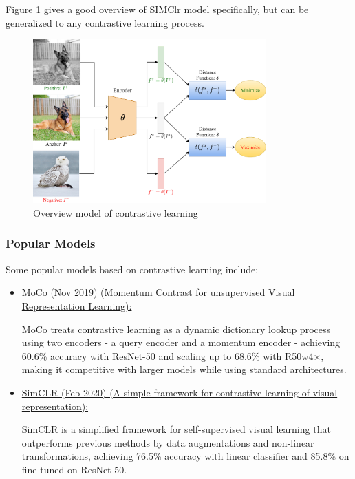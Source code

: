 \documentclass[letterpaper,12pt]{article}
\begin{document}
\begin{spacing}{1.125}
\begin{itemize}
\end{itemize}

Figure \ref{clr} gives a good overview of SIMClr model specifically, but can be
generalized to any contrastive learning process.

\begin{figure}
\includegraphics[width=0.8\textwidth]{clr.png}
  \caption{Overview model of contrastive learning}
  \label{clr}
\end{figure}

\subsubsection{Popular Models}

Some popular models based on contrastive learning include:

\begin{itemize}
  \item \href{https://arxiv.org/abs/1911.05722}{MoCo (Nov 2019) (Momentum
    Contrast for unsupervised Visual Representation Learning):}

MoCo treats contrastive learning as a dynamic dictionary lookup process using two encoders - a
query encoder and a momentum encoder - achieving 60.6\% accuracy with ResNet-50 and scaling
up to 68.6\% with R50w4×, making it competitive with larger models while using standard
architectures.
\item \href{https://arxiv.org/abs/2002.05709}{SimCLR (Feb 2020) (A simple framework for contrastive learning of
  visual representation):}

SimCLR is a simplified framework for self-supervised visual learning that outperforms previous
methods by data augmentations and non-linear transformations, achieving 76.5\% accuracy with
linear classifier and 85.8\% on fine-tuned on ResNet-50.


\end{itemize}
\end{spacing}
\end{document}
